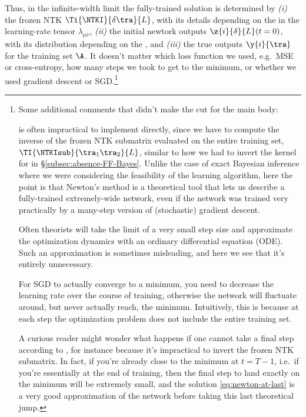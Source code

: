 Thus, in the infinite-width limit the fully-trained solution is determined by \emph{(i)} the frozen NTK $\Ti{\NTKI}{\delta\tra}{L}$, with its details depending on the  in the learning-rate tensor $\lambda_{\mu\nu}$,
\emph{(ii)} the initial newtork outputs $\z{i}{\delta}{L}(t=0)$, with its distribution depending on the , and \emph{(iii)} the true outputs $\y{i}{\tra}$ for the training set $\A$. It doesn't matter which loss function we used, e.g.~MSE or cross-entropy, how many steps we took to get to the minimum, or whether we used gradient descent or SGD.\footnote{
    Some additional comments that didn't make the cut for the main body:
    \bi
    \item {} is often impractical to implement directly, since we have to compute the inverse of the frozen NTK submatrix evaluated on the entire training set, $\TI{\NTKIsub}{\tra_1 \tra_2}{L}$, similar to how we had to invert the kernel for  in \S\ref{subsec:absence-FF-Bayes}. Unlike the case of exact Bayesian inference where we were considering the feasibility of the learning algorithm, here the point is that Newton's method is a theoretical tool that lets us describe a fully-trained  extremely-wide network, even if the network was trained very practically by a many-step version of (stochastic) gradient descent.
    \item Often theorists will take the limit of a very small step size and approximate the optimization dynamics with an ordinary differential equation (ODE). Such an approximation is sometimes misleading, and here we see that it's entirely unnecessary.
    \item For SGD to actually converge to a minimum, you need to decrease the learning rate over the course of training, otherwise the network will fluctuate around, but never actually reach, the minimum. Intuitively, this is because at each step the optimization problem does not include the entire training set.
    \item A curious reader might wonder what happens if one cannot take a final step according to , for instance because it's impractical to invert the frozen NTK submatrix. In fact, if you're already close to the minimum at $t=T-1$, i.e.~if you're essentially at the end of training, then the final step to land exactly on the minimum will be extremely small, and the solution \eqref{eq:newton-at-last} is a very good approximation of the network before taking this last theoretical jump.
    \ei
}

